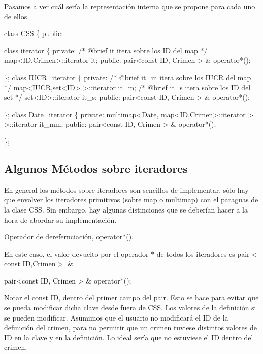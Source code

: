 Pasamos a ver cuál sería la representación interna que se propone para cada uno de ellos. 
\begin{DoxyCode}
\textcolor{keyword}{class }CSS \{
\textcolor{keyword}{public}:


    \textcolor{keyword}{class }iterator \{
    \textcolor{keyword}{private}:
        \textcolor{comment}{/* @brief it  itera sobre los ID del map }
\textcolor{comment}{      */}
        map<ID,Crimen>::iterator it;
    \textcolor{keyword}{public}:
           pair<const ID, Crimen > & operator*();   
    
    \};
    \textcolor{keyword}{class }IUCR\_iterator \{
    \textcolor{keyword}{private}:
      \textcolor{comment}{/* @brief it\_m itera sobre los IUCR del map }
\textcolor{comment}{      */}
      map<IUCR,set<ID> >::iterator it\_m; 
    \textcolor{comment}{/* @brief it\_s itera sobre los ID del set }
\textcolor{comment}{      */}
      set<ID>::iterator it\_s;
    \textcolor{keyword}{public}: 
        pair<const ID, Crimen > & operator*();

     \};
    \textcolor{keyword}{class }Date\_iterator \{
\textcolor{keyword}{private}:
         multimap<Date, map<ID,Crimen>::iterator > >::iterator it\_mm;
      \textcolor{keyword}{public}:
        pair<const ID, Crimen > & operator*();
    
     \};
\end{DoxyCode}
\hypertarget{index_métodosIt}{}\subsection{Algunos Métodos sobre iteradores}\label{index_métodosIt}
En general los métodos sobre iteradores son sencillos de implementar, sólo hay que envolver los iteradores primitivos (sobre map o multimap) con el paraguas de la clase C\+S\+S. Sin embargo, hay algunas distinciones que se deberían hacer a la hora de abordar su implementación.

\begin{DoxyItemize}
\item Operador de derefernciación, operator$\ast$().\end{DoxyItemize}
En este caso, el valor devuelto por el operador $\ast$ de todos los iteradores es pair$<$const I\+D,\+Crimen$>$ \&


\begin{DoxyCode}
pair<const ID, Crimen > &  operator*();   
\end{DoxyCode}


Notar el const I\+D, dentro del primer campo del pair. Esto se hace para evitar que se pueda modificar dicha clave desde fuera de C\+S\+S. Los valores de la definición si se pueden modificar. Asumimos que el usuario no modificará el I\+D de la definición del crimen, para no permitir que un crimen tuviese distintos valores de I\+D en la clave y en la definición. Lo ideal sería que no estuviese el I\+D dentro del crimen.

